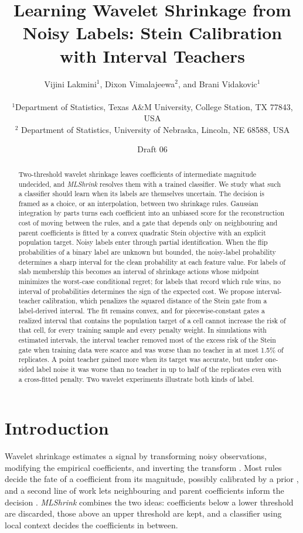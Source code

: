 \documentclass[11pt]{article}
\title{Learning Wavelet Shrinkage from Noisy Labels: 
Stein Calibration with Interval Teachers}
\author{  Vijini Lakmini$^{1}$, Dixon Vimalajeewa$^{2}$,  and Brani Vidakovic$^{1}$ \\
\\
{\small $^{1}$Department of Statistics, Texas A\&M University, College Station, TX 77843, USA} \\
\small $^{2}$ Department of Statistics, University of Nebraska, Lincoln, NE 68588, USA}
\date{Draft 06}
\theoremstyle{plain}
\theoremstyle{definition}
\theoremstyle{remark}
\begin{document}
\maketitle

\begin{abstract}
Two-threshold wavelet shrinkage leaves coefficients of intermediate magnitude undecided, and
\emph{MLShrink} resolves them with a trained classifier. We study what such a classifier
should learn when its labels are themselves uncertain. The decision is framed as a choice, or
an interpolation, between two shrinkage rules. Gaussian integration by parts turns each
coefficient into an unbiased score for the reconstruction cost of moving between the rules, and
a gate that depends only on neighbouring and parent coefficients is fitted by a convex quadratic
Stein objective with an explicit population target. Noisy labels enter through partial
identification. When the flip probabilities of a binary label are unknown but bounded, the
noisy-label probability determines a sharp interval for the clean probability at each feature
value. For labels of slab membership this becomes an interval of shrinkage actions whose
midpoint minimizes the worst-case conditional regret; for labels that record which rule wins,
no interval of probabilities determines the sign of the expected cost. We propose
interval-teacher calibration, which penalizes the squared distance of the Stein gate from a
label-derived interval. The fit remains convex, and for piecewise-constant gates a realized
interval that contains the population target of a cell cannot increase the risk of that cell,
for every training sample and every penalty weight. In simulations with estimated intervals,
the interval teacher removed most of the excess risk of the Stein gate when training data were
scarce and was worse than no teacher in at most 1.5\% of replicates. A point teacher gained more
when its target was accurate, but under one-sided label noise it was worse than no teacher in up
to half of the replicates even with a cross-fitted penalty. Two wavelet experiments illustrate
both kinds of label.
\end{abstract}

\section{Introduction}\label{sec:intro}

Wavelet shrinkage estimates a signal by transforming noisy observations, modifying the
empirical coefficients, and inverting the transform
\citep{donoho1995adapting}. Most rules decide the fate of a coefficient from its magnitude,
possibly calibrated by a prior \citep{abramovich1998wavelet,clyde1998multiple,
vidakovic2001bams,johnstone2005empirical}, and a second line of work lets neighbouring and
parent coefficients inform the decision \citep{crouse1998wavelet,cai2001incorporating,
sendur2002bivariate}. \emph{MLShrink} \citep{vimalajeewa2026mlshrink} combines the two
ideas: coefficients below a lower threshold are discarded, those above an upper threshold
are kept, and a classifier using local context decides the coefficients in between.
\end{document}
